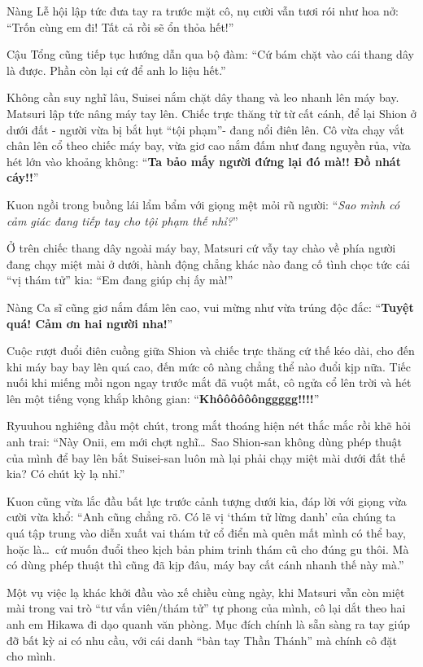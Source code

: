 \documentclass[../main.tex]{subfiles}
\begin{document}
Nàng Lễ hội lập tức đưa tay ra trước mặt cô, nụ cười vẫn tươi rói như hoa nở: ``Trốn cùng em đi! Tất cả rồi sẽ ổn thỏa hết!''

Cậu Tổng cũng tiếp tục hướng dẫn qua bộ đàm: ``Cứ bám chặt vào cái thang dây là được. Phần còn lại cứ để anh lo liệu hết.''

Không cần suy nghĩ lâu, Suisei nắm chặt dây thang và leo nhanh lên máy bay. Matsuri lập tức nâng máy tay lên. Chiếc trực thăng từ từ cất cánh, để lại Shion ở dưới đất - người vừa bị bắt hụt ``tội phạm''- đang nổi điên lên. Cô vừa chạy vắt chân lên cổ theo chiếc máy bay, vừa giơ cao nắm đấm như đang nguyền rủa, vừa hét lớn vào khoảng không: ``\textbf{Ta bảo mấy người đứng lại đó mà!! Đồ nhát cáy!!}''


Kuon ngồi trong buồng lái lẩm bẩm với giọng mệt mỏi rũ người: ``\textit{Sao mình có cảm giác đang tiếp tay cho tội phạm thế nhỉ?}''

Ở trên chiếc thang dây ngoài máy bay, Matsuri cứ vẫy tay chào về phía người đang chạy miệt mài ở dưới, hành động chẳng khác nào đang cố tình chọc tức cái ``vị thám tử'' kia: ``Em đang giúp chị ấy mà!''

Nàng Ca sĩ cũng giơ nắm đấm lên cao, vui mừng như vừa trúng độc đắc: ``\textbf{Tuyệt quá! Cảm ơn hai người nha!}''

Cuộc rượt đuổi điên cuồng giữa Shion và chiếc trực thăng cứ thế kéo dài, cho đến khi máy bay bay lên quá cao, đến mức cô nàng chẳng thể nào đuổi kịp nữa. Tiếc nuối khi miếng mồi ngon ngay trước mắt đã vuột mất, cô ngửa cổ lên trời và hét lên một tiếng vọng khắp không gian: ``\textbf{Khôôôôôônggggg!!!!}''

Ryuuhou nghiêng đầu một chút, trong mắt thoáng hiện nét thắc mắc rồi khẽ hỏi anh trai: ``Này Onii, em mới chợt nghĩ\dots\ Sao Shion-san không dùng phép thuật của mình để bay lên bắt Suisei-san luôn mà lại phải chạy miệt mài dưới đất thế kia? Có chút kỳ lạ nhỉ.''

Kuon cũng vừa lắc đầu bất lực trước cảnh tượng dưới kia, đáp lời với giọng vừa cười vừa khổ: ``Anh cũng chẳng rõ. Có lẽ vị `thám tử lừng danh' của chúng ta quá tập trung vào diễn xuất vai thám tử cổ điển mà quên mất mình có thể bay, hoặc là\dots\ cứ muốn đuổi theo kịch bản phim trinh thám cũ cho đúng gu thôi. Mà có dùng phép thuật thì cũng đã kịp đâu, máy bay cất cánh nhanh thế này mà.''

\ct

Một vụ việc lạ khác khởi đầu vào xế chiều cùng ngày, khi Matsuri vẫn còn miệt mài trong vai trò ``tư vấn viên/thám tử'' tự phong của mình, cô lại dắt theo hai anh em Hikawa đi dạo quanh văn phòng. Mục đích chính là sẵn sàng ra tay giúp đỡ bất kỳ ai có nhu cầu, với cái danh ``bàn tay Thần Thánh'' mà chính cô đặt cho mình.
\end{document}
